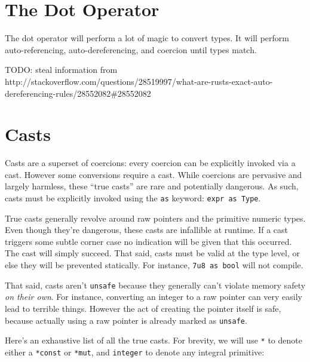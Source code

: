 \documentclass[a4paper,]{book}
\begin{document}
\section{The Dot Operator}\label{sec--dot-operator}

The dot operator will perform a lot of magic to convert types. It will
perform auto-referencing, auto-dereferencing, and coercion until types
match.

TODO: steal information from
http://stackoverflow.com/questions/28519997/what-are-rusts-exact-auto-dereferencing-rules/28552082\#28552082

\section{Casts}\label{sec--casts}

Casts are a superset of coercions: every coercion can be explicitly
invoked via a cast. However some conversions require a cast. While
coercions are pervasive and largely harmless, these ``true casts'' are
rare and potentially dangerous. As such, casts must be explicitly
invoked using the \texttt{as} keyword: \texttt{expr\ as\ Type}.

True casts generally revolve around raw pointers and the primitive
numeric types. Even though they're dangerous, these casts are infallible
at runtime. If a cast triggers some subtle corner case no indication
will be given that this occurred. The cast will simply succeed. That
said, casts must be valid at the type level, or else they will be
prevented statically. For instance, \texttt{7u8\ as\ bool} will not
compile.

That said, casts aren't \texttt{unsafe} because they generally can't
violate memory safety \emph{on their own}. For instance, converting an
integer to a raw pointer can very easily lead to terrible things.
However the act of creating the pointer itself is safe, because actually
using a raw pointer is already marked as \texttt{unsafe}.

Here's an exhaustive list of all the true casts. For brevity, we will
use \texttt{*} to denote either a \texttt{*const} or \texttt{*mut}, and
\texttt{integer} to denote any integral primitive:
\end{document}
